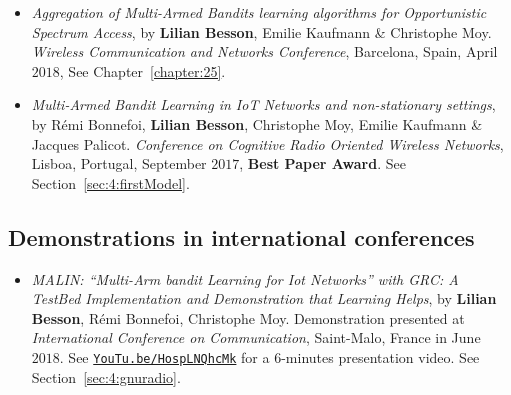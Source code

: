 \begin{itemize}
\item
    \emph{Aggregation of Multi-Armed Bandits learning algorithms for Opportunistic Spectrum Access},
    by \textbf{Lilian Besson}, Emilie Kaufmann \& Christophe Moy.
    \emph{Wireless Communication and Networks Conference},
    Barcelona, Spain, April $2018$,
    See Chapter~\ref{chapter:25}.
    \cite{Besson2018WCNC}

\item
    \emph{Multi-Armed Bandit Learning in IoT Networks and non-stationary settings},
    by Rémi Bonnefoi, \textbf{Lilian Besson}, Christophe Moy, Emilie Kaufmann \& Jacques Palicot.
    \emph{Conference on Cognitive Radio Oriented Wireless Networks},
    Lisboa, Portugal, September $2017$,
    \textbf{Best Paper Award}.
    See Section~\ref{sec:4:firstModel}.
    \cite{Bonnefoi17}

\end{itemize}

\subsection*{Demonstrations in international conferences}

\begin{itemize}

\item
    \emph{MALIN: ``Multi-Arm bandit Learning for Iot Networks'' with GRC: A TestBed Implementation and Demonstration that Learning Helps},
    by \textbf{Lilian Besson}, Rémi Bonnefoi, Christophe Moy.
    Demonstration presented at \emph{International Conference on Communication},
    Saint-Malo, France in June $2018$.
    See \href{https://YouTu.be/HospLNQhcMk}{\texttt{YouTu.be/HospLNQhcMk}} for a $6$-minutes presentation video.
    See Section~\ref{sec:4:gnuradio}.
    \cite{Besson2018ICT}

\end{itemize}


